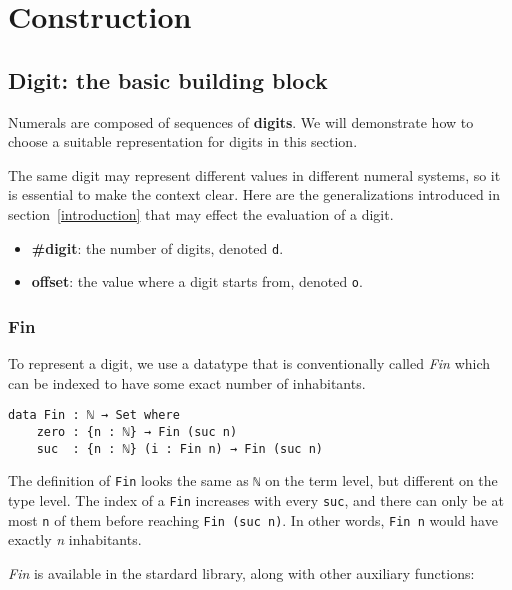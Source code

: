 \documentclass[../thesis.tex]{subfiles}
\begin{document}
\chapter{Construction}

\section{Digit: the basic building block}\label{digit}

Numerals are composed of sequences of \textbf{digits}. We will demonstrate how
to choose a suitable representation for digits in this section.

The same digit may represent different values in different numeral systems, so it
is essential to make the context clear. Here are the generalizations introduced in
section~\ref{introduction} that may effect the evaluation of a digit.

\begin{itemize}
    \item \textbf{\#digit}: the number of digits, denoted {\lstinline|d|}.
    \item \textbf{offset}: the value where a digit starts from, denoted {\lstinline|o|}.
\end{itemize}


\subsection{Fin}

To represent a digit, we use a datatype that is conventionally called \textit{Fin}
which can be indexed to have some exact number of inhabitants.

\begin{lstlisting}
data Fin : ℕ → Set where
    zero : {n : ℕ} → Fin (suc n)
    suc  : {n : ℕ} (i : Fin n) → Fin (suc n)
\end{lstlisting}

The definition of {\lstinline|Fin|} looks the same as {\lstinline|ℕ|} on the term
level, but different on the type level. The index of a {\lstinline|Fin|} increases
with every {\lstinline|suc|}, and there can only be at most {\lstinline|n|} of
them before reaching {\lstinline|Fin (suc n)|}. In other words, {\lstinline|Fin n|}
would have exactly \textit{n} inhabitants.

\textit{Fin} is available in the stardard library, along with other auxiliary
functions:
\end{document}
